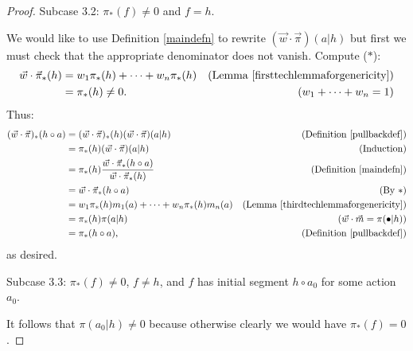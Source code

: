 \documentclass[runningheads]{llncs}
\begin{document}
\begin{proof}
    Subcase 3.2: $\pi_*(f)\not=0$ and $f=h$.

    We would like to use Definition \ref{maindefn} to rewrite
    $(\vec w\cdot\vec\pi)(a|h)$ but first we must check
    that the appropriate denominator does not vanish.
    Compute ($*$):
    \begin{align*}
        \vec w\cdot\vec\pi_*(h)
            &= w_1\pi_*(h)+\cdots+w_n\pi_*(h)
                &\mbox{(Lemma \ref{firsttechlemmaforgenericity})}\\
            &= \pi_*(h)\not=0.
                &\mbox{($w_1+\cdots+w_n=1$)}
    \end{align*}
    Thus:
    \begin{align*}
        (\vec w\cdot\vec\pi)_*(h\circ a)
            &= (\vec w\cdot\vec\pi)_*(h)
                (\vec w\cdot\vec\pi)(a|h)
                    &\mbox{(Definition \ref{pullbackdef})}\\
            &= \pi_*(h)(\vec w\cdot\vec\pi)(a|h)
                    &\mbox{(Induction)}\\
            &= \pi_*(h)
                \frac
                {\vec w\cdot\vec\pi_*(h\circ a)}
                {\vec w\cdot\vec\pi_*(h)}
                    &\mbox{(Definition \ref{maindefn})}\\
            &= \vec w\cdot\vec\pi_*(h\circ a)
                    &\mbox{(By $*$)}\\
            &= w_1\pi_*(h)m_1(a)+\cdots+w_n\pi_*(h)m_n(a)
                    &\mbox{(Lemma \ref{thirdtechlemmaforgenericity})}\\
            &= \pi_*(h)\pi(a|h)
                    &\mbox{($\vec w\cdot\vec m=\pi(\bullet|h)$)}\\
            &= \pi_*(h\circ a),
                    &\mbox{(Definition \ref{pullbackdef})}
    \end{align*}
    as desired.

    Subcase 3.3: $\pi_*(f)\not=0$, $f\not=h$, and
    $f$ has initial segment $h\circ a_0$ for some action $a_0$.

    It follows that $\pi(a_0|h)\not=0$ because otherwise clearly
    we would have $\pi_*(f)=0$.


\end{proof}
\end{document}
